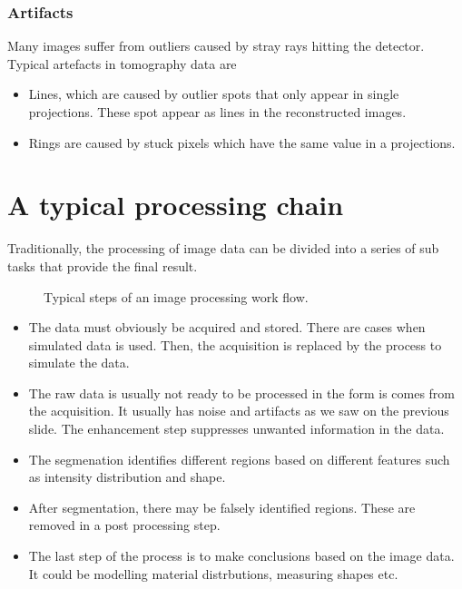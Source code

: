 \documentclass[letterpaper,10pt,english]{sphinxmanual}
\begin{document}
\subsubsection{Artifacts}
\label{\detokenize{02-ImageEnhancement:artifacts}}
\sphinxAtStartPar
Many images suffer from outliers caused by stray rays hitting the detector. Typical artefacts in tomography data are
\begin{itemize}
\item {} 
\sphinxAtStartPar
Lines, which are caused by outlier spots that only appear in single projections. These spot appear as lines in the reconstructed images.

\item {} 
\sphinxAtStartPar
Rings are caused by stuck pixels which have the same value in a projections.

\end{itemize}


\section{A typical processing chain}
\label{\detokenize{02-ImageEnhancement:a-typical-processing-chain}}
\sphinxAtStartPar
Traditionally, the processing of image data can be divided into a series of sub tasks that provide the final result.

\begin{figure}[htbp]
\centering
\capstart

\noindent{}
\caption{Typical steps of an image processing work flow.}\label{\detokenize{02-ImageEnhancement:id5}}\end{figure}
\begin{itemize}
\item {} 
\sphinxAtStartPar
{} The data must obviously be acquired and stored. There are cases when simulated data is used. Then, the acquisition is replaced by the process to simulate the data.

\item {} 
\sphinxAtStartPar
{} The raw data is usually not ready to be processed in the form is comes from the acquisition. It usually has noise and artifacts as we saw on the previous slide. The enhancement step suppresses unwanted information in the data.

\item {} 
\sphinxAtStartPar
{} The segmenation identifies different regions based on different features such as intensity distribution and shape.

\item {} 
\sphinxAtStartPar
{} After segmentation, there may be falsely identified regions. These are removed in a post processing step.

\item {} 
\sphinxAtStartPar
{} The last step of the process is to make conclusions based on the image data. It could be modelling material distrbutions, measuring shapes etc.

\end{itemize}
\end{document}
